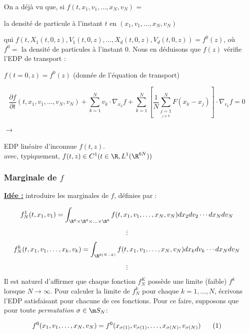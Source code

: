 \documentclass[12pt,a4paper]{article}
\begin{document}
	\begin{minipage}[t]{17cm}
		On a déjà vu que, si $f(t,x_1,v_1,\ldots,x_N,v_N)$ = \begin{minipage}[t]{10cm}
			la densité de particule à l'instant $t$ en $(x_1,v_1,\ldots,x_N,v_N)$
		\end{minipage}
	\end{minipage}
	
	qui $f(t,X_1(t,0,z),V_1(t,0,z),\ldots,X_d(t,0,z),V_d(t,0,z)) = f^0(z)$, où $f^0 = $ la densité de particules à l'instant 0. Nous en déduisons que $f(z)$ vérifie l'EDP de transport :
	
	$f(t=0,z) = f^0(z)$ (donnée de l'équation de transport)
	
	\[
	\dfrac{\partial f}{\partial t}(t,x_1,v_1,\ldots,v_N,v_N) + \displaystyle\sum_{k=1}^N v_k \cdot \nabla_{x_k} f + \sum_{k=1}^N \left[\frac{1}{N} \sum_{\underset{j\not=k}{j=1}}^N F(x_k-x_j)\right]\cdot\nabla_{v_k}f = 0
	\]
	
	$\rightarrow$ \begin{minipage}[t]{15cm}
		EDP linéaire d'inconnue $f(t,z)$.\\
		avec, typiquement, $f(t,z) \in C^1(t\in\R, L^1(\R^{6N}))$
	\end{minipage}
	
	\newpage
	
	\subsubsection{Marginale de $f$}
	
	\underline{\underline{\textbf{Idée :}}} introduire les marginales de $f$, définies par :
	
	\[
	f_N^1(t,x_1,v_1) = \displaystyle\int_{\R^6\times\R^6 \times \ldots \times \R^6} f(t,x_1,v_1,\ldots,x_N,v_N)dx_2dv_2\cdots dx_N dv_N 
	\]
	
	\[\vdots\]
	
	\[
	f_N^k(t,x_1,v_1,\ldots,x_k,v_k) = \displaystyle\int_{\R^{6(N-k)}} f(t,x_1,v_1,\ldots,x_N,v_N)dx_kdv_k\cdots dx_N dv_N
	\]
	
	\[\vdots\]
	
	Il est naturel d'affirmer que chaque fonction $f_N^K$ possède une limite (faible) $f^k$ lorsque $N \to \infty$.
	Pour calculer la limite de $f_N^k$ pour chaque $k = 1,\ldots,N$, écrivons l'EDP satisfaisant pour chacune de ces fonctions. Pour ce faire, supposons que pour toute \textit{permutation} $\sigma \in \m S_N$:
	
	\[
	f^0(x_1,v_1,\ldots,x_N,v_N) = f^0(x_{\sigma(1)},v_{\sigma(1)},\ldots,x_{\sigma(N)},v_{\sigma(N)}) \text{\hspace{.5cm} (1)}
	\]
	
\end{document}
